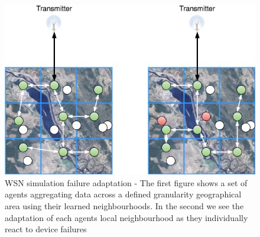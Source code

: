 \begin{figure}
	\centering
	\includegraphics[width=0.7\linewidth]{WSN_simulation_map_failure_adaptation}
	\caption{WSN simulation failure adaptation - The first figure shows a set of agents aggregating data across a defined granularity geographical area using their learned neighbourhoods. In the second we see the adaptation of each agents local neighbourhood as they individually react to device failures}
	\label{fig:wsnsimulationmapfailureadaptation}
\end{figure}


